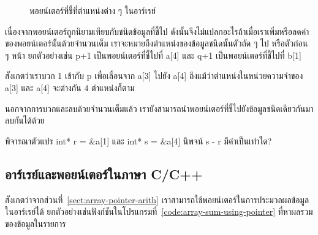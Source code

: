 \begin{figure}
\begin{center}
\end{center}
\caption{พอยน์เตอร์ที่{\wbr}ชี้{\wbr}ที่{\wbr}ตำแหน่ง{\wbr}ต่าง ๆ ใน{\wbr}อาร์เรย์}
\label{fig:array-array-pointer-arith}
\end{figure}

เนื่องจาก{\wbr}พอยน์เตอร์{\wbr}ถูก{\wbr}นิยาม{\wbr}เทียบ{\wbr}กับ{\wbr}ชนิด{\wbr}ข้อมูล{\wbr}ที่{\wbr}ชี้{\wbr}ไป{\wbr}
ดังนั้น{\wbr}จึง{\wbr}ไม่{\wbr}แปลก{\wbr}อะไร{\wbr}ถ้า{\wbr}เมื่อ{\wbr}เรา{\wbr}เพิ่ม{\wbr}หรือ{\wbr}ลด{\wbr}ค่า{\wbr}ของ{\wbr}พอยน์เตอร์{\wbr}นั้น{\wbr}ด้วย{\wbr}จำนวนเต็ม{\wbr}
เรา{\wbr}จะ{\wbr}หมายถึง{\wbr}ตำแหน่ง{\wbr}ของ{\wbr}ข้อมูล{\wbr}ชนิด{\wbr}นั้น{\wbr}ตัว{\wbr}ถัด ๆ ไป หรือ{\wbr}ตัว{\wbr}ก่อน ๆ หน้า ยก{\wbr}ตัวอย่าง{\wbr}เช่น {\ct
  p+1} เป็น{\wbr}พอยน์เตอร์{\wbr}ที่{\wbr}ชี้{\wbr}ไป{\wbr}ที่ {\ct a[4]} และ {\ct q+1} เป็น{\wbr}พอยน์เตอร์{\wbr}ที่{\wbr}ชี้{\wbr}ไป{\wbr}ที่{\wbr}
{\ct b[1]}

สังเกต{\wbr}ว่า{\wbr}เรา{\wbr}บวก 1 เข้า{\wbr}กับ {\ct p} เพื่อ{\wbr}เลื่อน{\wbr}จาก {\ct a[3]} ไป{\wbr}ยัง {\ct a[4]}
ถึงแม้ว่า{\wbr}ตำแหน่ง{\wbr}ใน{\wbr}หน่วยความจำ{\wbr}ของ {\ct a[3]} และ {\ct a[4]} จะ{\wbr}ต่าง{\wbr}กัน 4
ตำแหน่ง{\wbr}ก็ตาม{\wbr}

นอกจาก{\wbr}การ{\wbr}บวก{\wbr}และ{\wbr}ลบ{\wbr}ด้วย{\wbr}จำนวนเต็ม{\wbr}แล้ว{\wbr}
เรา{\wbr}ยัง{\wbr}สามารถ{\wbr}นำ{\wbr}พอยน์เตอร์{\wbr}ที่{\wbr}ชี้{\wbr}ไป{\wbr}ยัง{\wbr}ข้อมูล{\wbr}ชนิด{\wbr}เดียวกัน{\wbr}มา{\wbr}ลบ{\wbr}กัน{\wbr}ได้{\wbr}ด้วย{\wbr}

\begin{quiz}{}
พิจารณา{\wbr}ตัวแปร {\ct int* r = \&a[1]} และ {\ct int* s = \&a[4]} นิพจน์ {\ct s
  - r} มี{\wbr}ค่า{\wbr}เป็น{\wbr}เท่าใด?
\end{quiz}

\subsection{อาร์เรย์{\wbr}และ{\wbr}พอยน์เตอร์{\wbr}ใน{\wbr}ภาษา C/C++}
\label{sect:array-array-pointer-c}

สังเกต{\wbr}ว่า{\wbr}จาก{\wbr}ส่วน{\wbr}ที่~\ref{sect:array-pointer-arith}
เรา{\wbr}สามารถ{\wbr}ใช้{\wbr}พอยน์เตอร์{\wbr}ใน{\wbr}การ{\wbr}ประมวลผล{\wbr}ข้อมูล{\wbr}ใน{\wbr}อาร์เรย์{\wbr}ได้{\wbr}
ยก{\wbr}ตัวอย่าง{\wbr}เช่น{\wbr}ฟังก์ชัน{\wbr}ใน{\wbr}โปรแกรม{\wbr}ที่~\ref{code:array-sum-using-pointer}
ที่{\wbr}หา{\wbr}ผลรวม{\wbr}ของ{\wbr}ข้อมูล{\wbr}ใน{\wbr}รายการ{\wbr}

